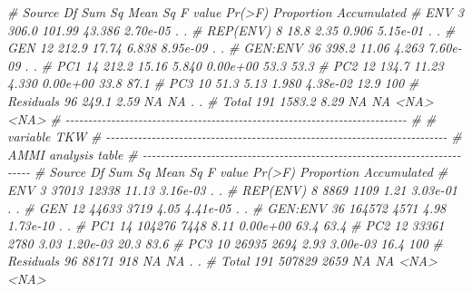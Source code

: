 \documentclass[
]{book}
\newenvironment{Shaded}{\begin{snugshade}}{\end{snugshade}}
\newcommand{\CommentTok}[1]{\textcolor[rgb]{0.56,0.35,0.01}{\textit{#1}}}
\numberwithin{equation}{section}
\begin{document}
\begin{Shaded}
\begin{Highlighting}[]
\CommentTok{\#     Source  Df Sum Sq Mean Sq F value   Pr(\textgreater{}F) Proportion Accumulated}
\CommentTok{\#        ENV   3  306.0  101.99  43.386 2.70e{-}05          .           .}
\CommentTok{\#   REP(ENV)   8   18.8    2.35   0.906 5.15e{-}01          .           .}
\CommentTok{\#        GEN  12  212.9   17.74   6.838 8.95e{-}09          .           .}
\CommentTok{\#    GEN:ENV  36  398.2   11.06   4.263 7.60e{-}09          .           .}
\CommentTok{\#        PC1  14  212.2   15.16   5.840 0.00e+00       53.3        53.3}
\CommentTok{\#        PC2  12  134.7   11.23   4.330 0.00e+00       33.8        87.1}
\CommentTok{\#        PC3  10   51.3    5.13   1.980 4.38e{-}02       12.9         100}
\CommentTok{\#  Residuals  96  249.1    2.59      NA       NA          .           .}
\CommentTok{\#      Total 191 1583.2    8.29      NA       NA       \textless{}NA\textgreater{}        \textless{}NA\textgreater{}}
\CommentTok{\# {-}{-}{-}{-}{-}{-}{-}{-}{-}{-}{-}{-}{-}{-}{-}{-}{-}{-}{-}{-}{-}{-}{-}{-}{-}{-}{-}{-}{-}{-}{-}{-}{-}{-}{-}{-}{-}{-}{-}{-}{-}{-}{-}{-}{-}{-}{-}{-}{-}{-}{-}{-}{-}{-}{-}{-}{-}{-}{-}{-}{-}{-}{-}{-}{-}{-}{-}{-}{-}{-}{-}{-}{-}{-}{-}}
\CommentTok{\# }
\CommentTok{\# variable TKW }
\CommentTok{\# {-}{-}{-}{-}{-}{-}{-}{-}{-}{-}{-}{-}{-}{-}{-}{-}{-}{-}{-}{-}{-}{-}{-}{-}{-}{-}{-}{-}{-}{-}{-}{-}{-}{-}{-}{-}{-}{-}{-}{-}{-}{-}{-}{-}{-}{-}{-}{-}{-}{-}{-}{-}{-}{-}{-}{-}{-}{-}{-}{-}{-}{-}{-}{-}{-}{-}{-}{-}{-}{-}{-}{-}{-}{-}{-}}
\CommentTok{\# AMMI analysis table}
\CommentTok{\# {-}{-}{-}{-}{-}{-}{-}{-}{-}{-}{-}{-}{-}{-}{-}{-}{-}{-}{-}{-}{-}{-}{-}{-}{-}{-}{-}{-}{-}{-}{-}{-}{-}{-}{-}{-}{-}{-}{-}{-}{-}{-}{-}{-}{-}{-}{-}{-}{-}{-}{-}{-}{-}{-}{-}{-}{-}{-}{-}{-}{-}{-}{-}{-}{-}{-}{-}{-}{-}{-}{-}{-}{-}{-}{-}}
\CommentTok{\#     Source  Df Sum Sq Mean Sq F value   Pr(\textgreater{}F) Proportion Accumulated}
\CommentTok{\#        ENV   3  37013   12338   11.13 3.16e{-}03          .           .}
\CommentTok{\#   REP(ENV)   8   8869    1109    1.21 3.03e{-}01          .           .}
\CommentTok{\#        GEN  12  44633    3719    4.05 4.41e{-}05          .           .}
\CommentTok{\#    GEN:ENV  36 164572    4571    4.98 1.73e{-}10          .           .}
\CommentTok{\#        PC1  14 104276    7448    8.11 0.00e+00       63.4        63.4}
\CommentTok{\#        PC2  12  33361    2780    3.03 1.20e{-}03       20.3        83.6}
\CommentTok{\#        PC3  10  26935    2694    2.93 3.00e{-}03       16.4         100}
\CommentTok{\#  Residuals  96  88171     918      NA       NA          .           .}
\CommentTok{\#      Total 191 507829    2659      NA       NA       \textless{}NA\textgreater{}        \textless{}NA\textgreater{}}

\end{Highlighting}
\end{Shaded}
\end{document}
